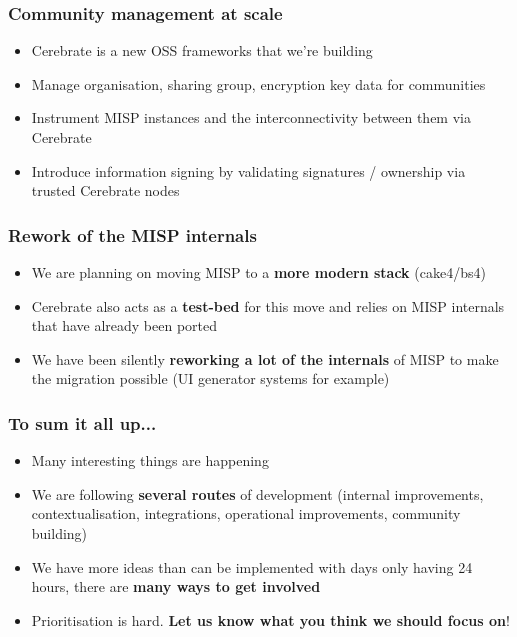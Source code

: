 \begin{frame}
\frametitle{Community management at scale}
\begin{itemize}
	\item Cerebrate is a new OSS frameworks that we're building
        \item Manage organisation, sharing group, encryption key data for communities
        \item Instrument MISP instances and the interconnectivity between them via Cerebrate
        \item Introduce information signing by validating signatures / ownership via trusted Cerebrate nodes
\end{itemize}
\end{frame}

\begin{frame}
\frametitle{Rework of the MISP internals}
\begin{itemize}
	\item We are planning on moving MISP to a {\bf more modern stack} (cake4/bs4)
        \item Cerebrate also acts as a {\bf test-bed} for this move and relies on MISP internals that have already been ported
        \item We have been silently {\bf reworking a lot of the internals} of MISP to make the migration possible (UI generator systems for example)
\end{itemize}
\end{frame}

\begin{frame}
  \frametitle{To sum it all up...}
  \begin{itemize}
     \item Many interesting things are happening
     \item We are following {\bf several routes} of development (internal improvements, contextualisation, integrations, operational improvements, community building)
     \item We have more ideas than can be implemented with days only having 24 hours, there are {\bf many ways to get involved}
     \item Prioritisation is hard. {\bf Let us know what you think we should focus on}!
  \end{itemize}
\end{frame}

